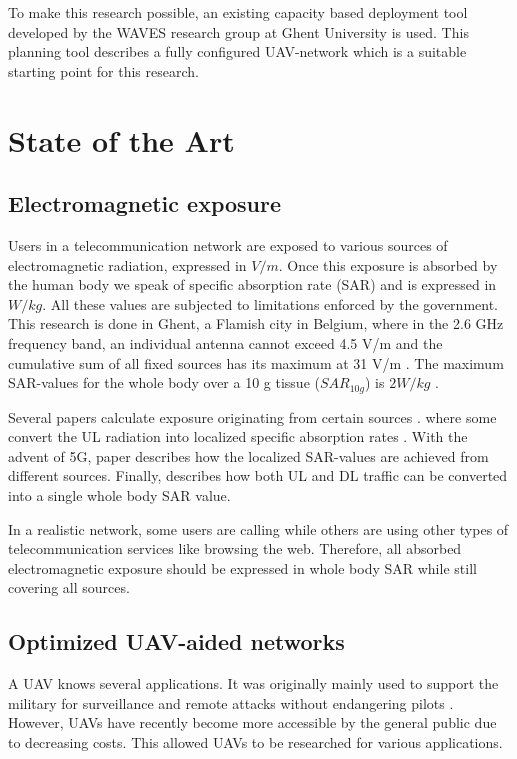\documentclass[twocolumn]{phdsymp} %
\begin{document}
To make this research possible, 
an existing capacity based deployment tool developed by the WAVES research group at Ghent University is used.
This planning tool describes a fully configured \gls{UAV}-network which is a suitable starting point for this research.


\section{State of the Art}
\subsection{Electromagnetic exposure}

Users in a telecommunication network are exposed to various sources of electromagnetic radiation, expressed in $V/m$. Once this exposure is absorbed by the human 
body we speak of specific absorption rate (SAR) and is expressed in $W/kg$. All these values are 
subjected to limitations enforced by the government. This research is done in Ghent, 
a Flamish city in Belgium, where in the 2.6 GHz frequency band, an individual antenna cannot exceed 4.5 V/m and the cumulative sum of all 
fixed sources has its maximum at 31 V/m \cite{J23, S13_normenBelgie}. The maximum SAR-values for the whole body 
over a 10 g tissue ($SAR_{10g}$) is $2 W/kg$ \cite{J30}. 

Several papers calculate exposure originating from certain sources  \cite{J6_originalExposureFormula, J1, J10_RDP, J10.1}. 
where some convert the \gls{UL} radiation into localized specific absorption rates \cite{ J10_RDP, J10.1}. 
With the advent of 5G, paper \cite{J17_kuehn2019modelling} describes 
how the localized \gls{SAR}-values are achieved from different sources.
Finally, \cite{J22_plets2015joint} describes how both \gls{UL} and \gls{DL} traffic can be converted into a single  whole body SAR value.

In a realistic network, some users are calling while others are using other types of telecommunication services like browsing the web.
Therefore, all absorbed electromagnetic exposure should be expressed in whole body SAR while still covering all sources.

\subsection{Optimized \gls{UAV}-aided networks}

A \gls{UAV} knows several applications. It was originally mainly used to support the military for surveillance and remote attacks without 
endangering pilots \cite{U12}. However, \gls{UAV}s have recently become more accessible by the general public due to decreasing costs. This 
allowed \gls{UAV}s to be researched for various applications.
\end{document}
